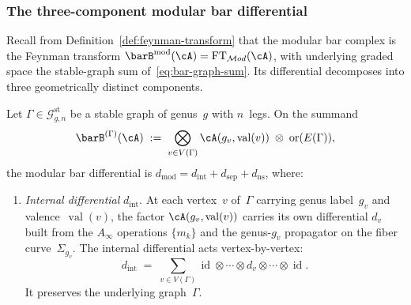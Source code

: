 \subsubsection{The three-component modular bar differential}
\label{subsubsec:three-component-differential}

Recall from Definition~\ref{def:feynman-transform} that the modular bar
complex is the Feynman transform
$\barB^{\mathrm{mod}}(\cA) = \mathrm{FT}_{\mathcal{M}od}(\cA)$,
with underlying graded space the stable-graph sum
of~\eqref{eq:bar-graph-sum}. Its differential decomposes into three
geometrically distinct components.

\begin{definition}
\label{def:three-component-modular-bar}
Let $\Gamma \in \mathcal{G}^{\mathrm{st}}_{g,n}$ be a stable graph
of genus~$g$ with $n$~legs. On the summand
\[
\barB^{(\Gamma)}(\cA)
\;:=\;
\bigotimes_{v \in V(\Gamma)} \cA(g_v, \operatorname{val}(v))
\;\otimes\; \operatorname{or}(E(\Gamma)),
\]
the modular bar differential is
$d_{\mathrm{mod}} = d_{\mathrm{int}} + d_{\mathrm{sep}} + d_{\mathrm{ns}}$,
where:
\begin{enumerate}[label=\textup{(\roman*)}]
\item \emph{Internal differential} $d_{\mathrm{int}}$.
 At each vertex~$v$ of~$\Gamma$ carrying genus label~$g_v$ and
 valence~$\operatorname{val}(v)$, the factor
 $\cA(g_v, \operatorname{val}(v))$ carries its own differential
 $d_v$ built from the $A_\infty$ operations $\{m_k\}$ and the
 genus-$g_v$ propagator on the fiber curve~$\Sigma_{g_v}$.
 The internal differential acts vertex-by-vertex:
 \begin{equation}\label{eq:d-int}
 d_{\mathrm{int}}
 \;=\;
 \sum_{v \in V(\Gamma)}
 \operatorname{id} \otimes \cdots \otimes d_v
 \otimes \cdots \otimes \operatorname{id}.
 \end{equation}
 It preserves the underlying graph~$\Gamma$.


\end{enumerate}
\end{definition}
